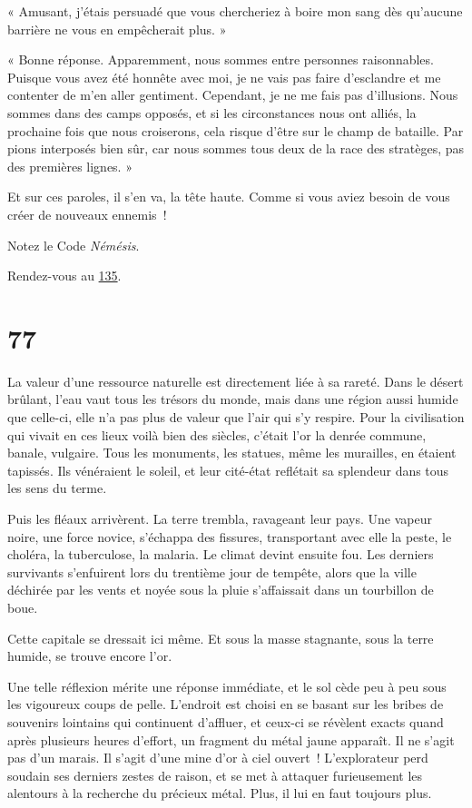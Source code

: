 \documentclass{report}
\newcommand{\gsection}[1]{
    \section{#1}
    \label{section-#1}
}
\newcommand{\glink}[1]{\hyperref[section-#1]{#1}}
\begin{document}
« Amusant, j'étais persuadé que vous chercheriez à boire mon sang dès qu'aucune barrière ne vous en empêcherait plus. »

« Bonne réponse. Apparemment, nous sommes entre personnes raisonnables. Puisque vous avez été honnête avec moi, je ne vais pas faire d'esclandre et me contenter de m'en aller gentiment. Cependant, je ne me fais pas d'illusions. Nous sommes dans des camps opposés, et si les circonstances nous ont alliés, la prochaine fois que nous croiserons, cela risque d'être sur le champ de bataille. Par pions interposés bien sûr, car nous sommes tous deux de la race des stratèges, pas des premières lignes. »

Et sur ces paroles, il s'en va, la tête haute. Comme si vous aviez besoin de vous créer de nouveaux ennemis !

Notez le Code \emph{Némésis}.

Rendez-vous au \glink{135}.

\gsection{77}

La valeur d'une ressource naturelle est directement liée à sa rareté. Dans le désert brûlant, l'eau vaut tous les trésors du monde, mais dans une région aussi humide que celle-ci, elle n'a pas plus de valeur que l'air qui s'y respire. Pour la civilisation qui vivait en ces lieux voilà bien des siècles, c'était l'or la denrée commune, banale, vulgaire. Tous les monuments, les statues, même les murailles, en étaient tapissés. Ils vénéraient le soleil, et leur cité-état reflétait sa splendeur dans tous les sens du terme.

Puis les fléaux arrivèrent. La terre trembla, ravageant leur pays. Une vapeur noire, une force novice, s'échappa des fissures, transportant avec elle la peste, le choléra, la tuberculose, la malaria. Le climat devint ensuite fou. Les derniers survivants s'enfuirent lors du trentième jour de tempête, alors que la ville déchirée par les vents et noyée sous la pluie s'affaissait dans un tourbillon de boue.

Cette capitale se dressait ici même. Et sous la masse stagnante, sous la terre humide, se trouve encore l'or.

Une telle réflexion mérite une réponse immédiate, et le sol cède peu à peu sous les vigoureux coups de pelle. L'endroit est choisi en se basant sur les bribes de souvenirs lointains qui continuent d'affluer, et ceux-ci se révèlent exacts quand après plusieurs heures d'effort, un fragment du métal jaune apparaît.
Il ne s'agit pas d'un marais. Il s'agit d'une mine d'or à ciel ouvert ! L'explorateur perd soudain ses derniers zestes de raison, et se met à attaquer furieusement les alentours à la recherche du précieux métal. Plus, il lui en faut toujours plus.
\end{document}
